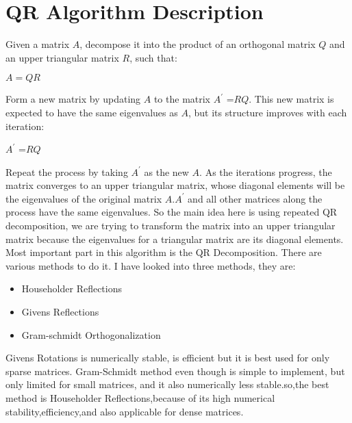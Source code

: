 \documentclass[journal]{IEEEtran}
\begin{document}
\section*{QR Algorithm Description}
Given a matrix $ A $, decompose it into the product of an orthogonal matrix $ Q $ and an upper triangular matrix $ R $, such that:
\begin{center}
    $A = QR$
\end{center}
Form a new matrix by updating $A$ to the matrix $ A^\prime$ =$ RQ $. This new matrix is expected to have the same eigenvalues as $A $, but its structure improves with each iteration:
\begin{center}
    $A^\prime$ =$ RQ$
\end{center}
Repeat the process by taking  $A^\prime$ as the new $A $. As the iterations progress, the matrix converges to an upper triangular matrix, whose diagonal elements will be the eigenvalues of the original matrix $ A $.$A^\prime$ and all other matrices along the process have the same eigenvalues. So the main idea here is using
repeated QR decomposition, we are trying to transform the matrix into an upper triangular matrix because the
eigenvalues for a triangular matrix are its diagonal elements.\\
Most important part in this algorithm is the QR Decomposition. There are various methods to do it. I have
looked into three methods, they are:
\begin{itemize}
    \item Householder Reflections
    \item Givens Reflections
    \item Gram-schmidt Orthogonalization
\end{itemize}
Givens Rotations is numerically stable, is efficient but it is best used for only sparse matrices. Gram-Schmidt method even though is simple to implement, but only limited for small matrices, and it also
numerically less stable.so,the best method is Householder Reflections,because of its high numerical stability,efficiency,and also applicable for dense matrices.
\end{document}
